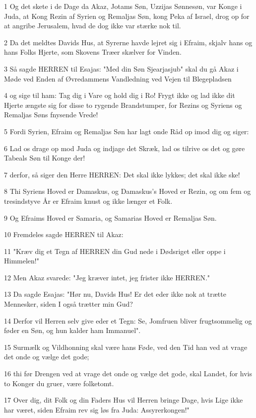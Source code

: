 \par 1 Og det skete i de Dage da Akaz, Jotams Søn, Uzzijas Sønnesøn, var Konge i Juda, at Kong Rezin af Syrien og Remaljas Søn, kong Peka af Israel, drog op for at angribe Jerusalem, hvad de dog ikke var stærke nok til.
\par 2 Da det meldtes Davids Hus, at Syrerne havde lejret sig i Efraim, skjalv hans og hans Folks Hjerte, som Skovens Træer skælver for Vinden.
\par 3 Så sagde HERREN til Esajas: "Med din Søn Sjearjasjub" skal du gå Akaz i Møde ved Enden af Øvredammens Vandledning ved Vejen til Blegepladsen
\par 4 og sige til ham: Tag dig i Vare og hold dig i Ro! Frygt ikke og lad ikke dit Hjerte ængste sig for disse to rygende Brandstumper, for Rezins og Syriens og Remaljas Søns fnysende Vrede!
\par 5 Fordi Syrien, Efraim og Remaljas Søn har lagt onde Råd op imod dig og siger:
\par 6 Lad os drage op mod Juda og indjage det Skræk, lad os tilrive os det og gøre Tabeals Søn til Konge der!
\par 7 derfor, så siger den Herre HERREN: Det skal ikke lykkes; det skal ikke ske!
\par 8 Thi Syriens Hoved er Damaskus, og Damaskus's Hoved er Rezin, og om fem og tresindstyve År er Efraim knust og ikke længer et Folk.
\par 9 Og Efraims Hoved er Samaria, og Samarias Hoved er Remaljas Søn.
\par 10 Fremdeles sagde HERREN til Akaz:
\par 11 "Kræv dig et Tegn af HERREN din Gud nede i Dødsriget eller oppe i Himmelen!"
\par 12 Men Akaz svarede: "Jeg kræver intet, jeg frister ikke HERREN."
\par 13 Da sagde Esajas: "Hør nu, Davids Hus! Er det eder ikke nok at trætte Mennesker, siden I også trætter min Gud?
\par 14 Derfor vil Herren selv give eder et Tegn: Se, Jomfruen bliver frugtsommelig og føder en Søn, og hun kalder ham Immanuel".
\par 15 Surmælk og Vildhonning skal være hans Føde, ved den Tid han ved at vrage det onde og vælge det gode;
\par 16 thi før Drengen ved at vrage det onde og vælge det gode, skal Landet, for hvis to Konger du gruer, være folketomt.
\par 17 Over dig, dit Folk og din Faders Hus vil Herren bringe Dage, hvis Lige ikke har været, siden Efraim rev sig løs fra Juda: Assyrerkongen!"
